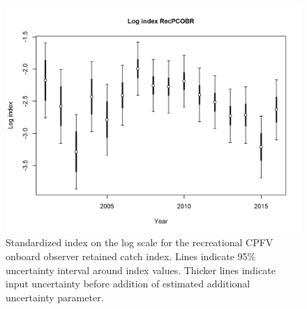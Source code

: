 \documentclass[12pt,]{article}
\begin{document}
\begin{figure}[htbp]
\centering
\includegraphics{r4ss/plots_mod1/index4_logcpuedata_RecPCOBR.png}
\caption{Standardized index on the log scale for the recreational CPFV
onboard observer retained catch index. Lines indicate 95\% uncertainty
interval around index values. Thicker lines indicate input uncertainty
before addition of estimated additional uncertainty parameter.
\label{fig:Fleet12_index4_logcpuedata_RecPCOBR}}
\end{figure}

\FloatBarrier
\end{document}
